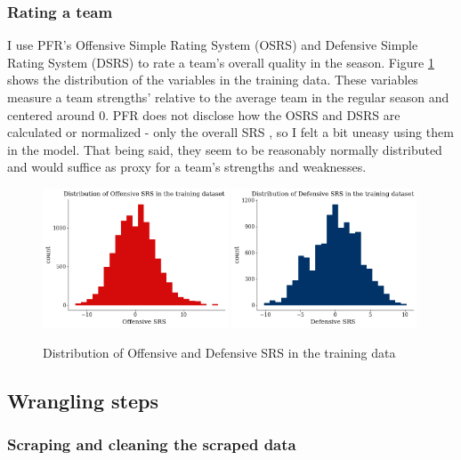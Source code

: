 \documentclass[12pt, letterpaper, twoside]{article}
\begin{document}
\subsubsection{Rating a team}
I use PFR's Offensive Simple Rating System (OSRS) and Defensive Simple Rating System (DSRS) to rate a team's overall quality in the season. Figure \ref{fig:srs} shows the distribution of the variables in the training data. These variables measure a team strengths' relative to the average team in the regular season and centered around 0. PFR does not disclose how the OSRS and DSRS are calculated or normalized - only the overall SRS \citep{srs}, so I felt a bit uneasy using them in the model. That being said, they seem to be reasonably normally distributed and would suffice as proxy for a team's strengths and weaknesses. 
\begin{figure}[H]%
	\centering
   \includegraphics[width=0.49\textwidth]{../09_figures/plot_offense.png} 
   \includegraphics[width=0.49\textwidth]{../09_figures/plot_defense.png} 

    \caption{Distribution of Offensive and Defensive SRS in the training data}
    \label{fig:srs}%
\end{figure}

\subsection{Wrangling steps} \label{data1}

\subsubsection{Scraping and cleaning the scraped data} 
\end{document}

